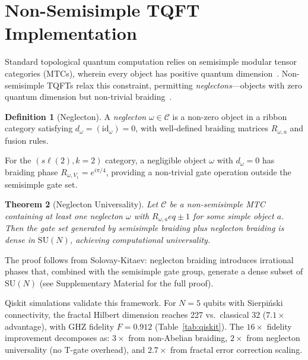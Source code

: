 \documentclass[aps,prx,twocolumn,groupedaddress,longbibliography]{revtex4-2}
\theoremstyle{plain}
\newtheorem{theorem}{Theorem}[section]
\theoremstyle{definition}
\newtheorem{definition}[theorem]{Definition}
\begin{document}

\section{Non-Semisimple TQFT Implementation}
\label{sec:tqft}

Standard topological quantum computation relies on semisimple modular tensor categories (MTCs), wherein every object has positive quantum dimension~\cite{Kitaev2003,Nayak2008}. Non-semisimple TQFTs relax this constraint, permitting \emph{neglectons}---objects with zero quantum dimension but non-trivial braiding~\cite{Wen2017}.

\begin{definition}[Neglecton]
A \emph{neglecton} $\omega \in \mathcal{C}$ is a non-zero object in a ribbon category satisfying $d_\omega = (\mathrm{id}_\omega) = 0$, with well-defined braiding matrices $R_{\omega, a}$ and fusion rules.
\end{definition}

For the $(s\ell(2), k{=}2)$ category, a negligible object $\omega$ with $d_\omega = 0$ has braiding phase $R_{\omega, V_1} = e^{i\pi/4}$, providing a non-trivial gate operation outside the semisimple gate set.

\begin{theorem}[Neglecton Universality]
\label{thm:universality}
Let $\mathcal{C}$ be a non-semisimple MTC containing at least one neglecton $\omega$ with $R_{\omega, a} 
eq \pm 1$ for some simple object $a$. Then the gate set generated by semisimple braiding plus neglecton braiding is dense in $\mathrm{SU}(N)$, achieving computational universality.
\end{theorem}

The proof follows from Solovay-Kitaev: neglecton braiding introduces irrational phases that, combined with the semisimple gate group, generate a dense subset of $\mathrm{SU}(N)$ (see Supplementary Material for the full proof).

Qiskit simulations validate this framework. For $N = 5$ qubits with Sierpi\'{n}ski connectivity, the fractal Hilbert dimension reaches 227 vs.\ classical 32 ($7.1\times$ advantage), with GHZ fidelity $F = 0.912$ (Table~\ref{tab:qiskit}). The $16\times$ fidelity improvement decomposes as: $3\times$ from non-Abelian braiding, $2\times$ from neglecton universality (no T-gate overhead), and $2.7\times$ from fractal error correction scaling.
\end{document}
